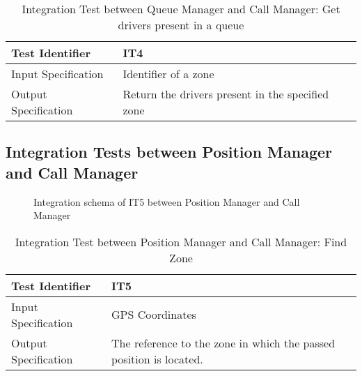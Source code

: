 \documentclass[a4paper]{article}
\begin{document}
\begin{table} [H]
\begin{center}
\begin{tabular}{| L | p{\rightcol} |}
  \hline
  Test Identifier & IT4 \\
  \hline
  Input Specification & Identifier of a zone\\
  \hline
  Output Specification & Return the drivers present in the specified zone\\
  \hline
\end{tabular}
\end{center}
\caption{Integration Test between Queue Manager and Call Manager: Get drivers present in a queue}
\end{table}



\subsection{Integration Tests between Position Manager and Call Manager}

\begin{figure} [H]
\caption{Integration schema of IT5 between Position Manager and Call Manager}
\end{figure}


\begin{table} [H]
\begin{center}
\begin{tabular}{| L | p{\rightcol} |}
  \hline
  Test Identifier & IT5 \\
  \hline
  Input Specification & GPS Coordinates\\
  \hline
  Output Specification & The reference to the zone in which the passed position is located.\\
  \hline
\end{tabular}
\end{center}
\caption{Integration Test between Position Manager and Call Manager: Find Zone}
\end{table}
\end{document}
